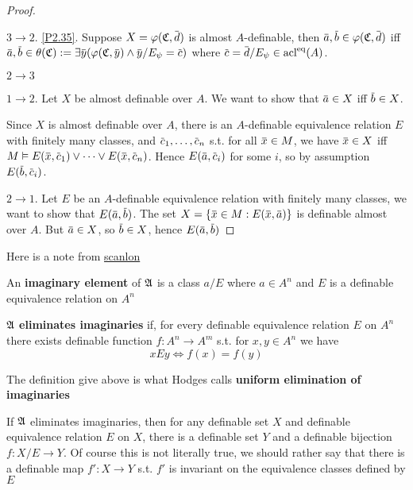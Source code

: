 \documentclass[11pt]{article}
\begin{document}
\begin{proof}
\label{Problem3}

\(3\to 2\). \ref{P2.35}. Suppose \(X=\varphi(\fC,\bard)\) is almost \(A\)-definable,
then \(\bara,\barb\in\varphi(\fC,\bard)\) iff \(\bara,\barb\in\theta(\fC):=\exists\bary(\varphi(\fC,\bary)\wedge\bary/E_\psi=\barc)\)
where \(\barc=\bard/E_\psi\in\acl^{\eq}(A)\).

\(2\to 3\)

\(1\to 2\). Let \(X\) be almost definable over \(A\). We want to show that \(\bara\in X\)
iff \(\barb\in X\).

Since \(X\) is almost definable over \(A\), there is an \(A\)-definable equivalence
relation \(E\) with finitely many classes, and \(\barc_1,\dots,\barc_n\) s.t. for all \(\barx\in M\),
we have \(\barx\in X\) iff \(M\vDash E(\barx,\barc_1)\vee\cdots\vee E(\barx,\barc_n)\). Hence \(E(\bara,\barc_i)\)
for some \(i\), so by assumption \(E(\barb,\barc_i)\).

\(2\to 1\). Let \(E\) be an \(A\)-definable equivalence relation with finitely many classes, we
want to show that \(E(\bara,\barb)\). The set \(X=\{\barx\in M:E(\barx,\bara)\}\) is definable
almost over \(A\). But \(\bara\in X\), so \(\barb\in X\), hence \(E(\bara,\barb)\)
\end{proof}


Here is a note from \href{https://math.berkeley.edu/\~scanlon/225af13lectures/20131810Lec15.pdf}{scanlon}
\begin{definition}[]
An \textbf{imaginary element} of \(\mathfrak{A}\) is a class \(a/E\) where \(a\in A^n\) and \(E\) is a definable
equivalence relation on \(A^n\)
\end{definition}

\begin{definition}[]
\(\mathfrak{A}\) \textbf{eliminates imaginaries} if, for every definable equivalence relation \(E\) on \(A^n\) there
exists definable function \(f:A^n\to A^m\) s.t. for \(x,y\in A^n\) we have
\begin{equation*}
xEy\Leftrightarrow f(x)=f(y)
\end{equation*}
\end{definition}

\begin{remark}
The definition give above is what Hodges calls \textbf{uniform elimination of imaginaries}
\end{remark}

\begin{remark}
If \(\mathfrak{A}\) eliminates imaginaries, then for any definable set \(X\) and definable equivalence
relation \(E\) on \(X\), there is a definable set \(Y\) and a definable bijection \(f:X/E\to Y\).
Of course this is not literally true, we should rather say that there is a definable
map \(f':X\to Y\) s.t. \(f'\) is invariant on the equivalence classes defined by \(E\)
\end{remark}
\end{document}
